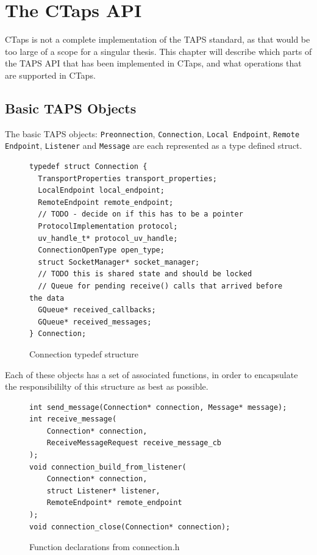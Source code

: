 \chapter{The CTaps API}
CTaps is not a complete implementation of the TAPS standard,
as that would be too large of a scope for a singular thesis.
This chapter will describe which parts of the TAPS API that has
been implemented in CTaps, and what operations that are supported
in CTaps.

\section{Basic TAPS Objects}
The basic TAPS objects:
\texttt{Preonnection}, \texttt{Connection}, \texttt{Local Endpoint}, \texttt{Remote Endpoint}, 
\texttt{Listener} and \texttt{Message} are each represented as a type defined
struct.

\begin{figure}[H]
\begin{verbatim}
typedef struct Connection {
  TransportProperties transport_properties;
  LocalEndpoint local_endpoint;
  RemoteEndpoint remote_endpoint;
  // TODO - decide on if this has to be a pointer
  ProtocolImplementation protocol;
  uv_handle_t* protocol_uv_handle;
  ConnectionOpenType open_type;
  struct SocketManager* socket_manager;
  // TODO this is shared state and should be locked
  // Queue for pending receive() calls that arrived before the data
  GQueue* received_callbacks;
  GQueue* received_messages;
} Connection;

\end{verbatim}
\caption{Connection typedef structure}
\end{figure} 

Each of these objects has a set of associated functions, in order to encapsulate
the responsibililty of this structure as best as possible. 

\begin{figure}[H]
\begin{verbatim}
int send_message(Connection* connection, Message* message);
int receive_message(
    Connection* connection,
    ReceiveMessageRequest receive_message_cb
);
void connection_build_from_listener(
    Connection* connection,
    struct Listener* listener,
    RemoteEndpoint* remote_endpoint
);
void connection_close(Connection* connection);
\end{verbatim}
\caption{Function declarations from connection.h}
\end{figure}


